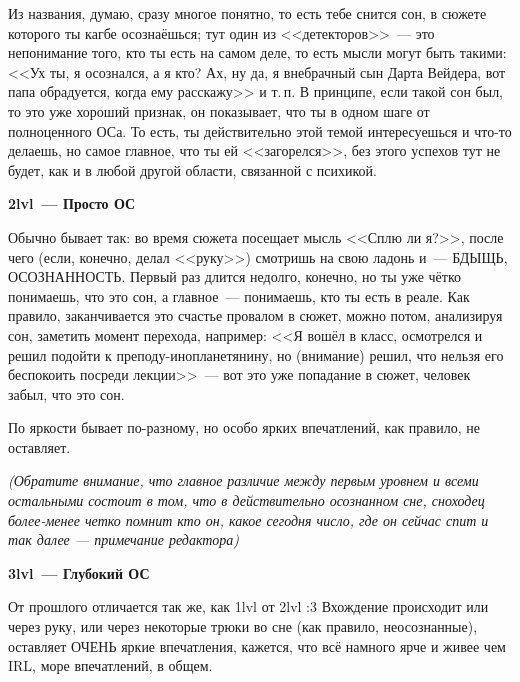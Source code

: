 \documentclass[a4paper,14pt,oneside]{memoir}
\begin{document}
\medskip

Из названия, думаю, сразу многое понятно, то есть тебе снится сон, в сюжете которого ты кагбе осознаёшься; тут один из <<детекторов>>~--- это непонимание того, кто ты есть на самом деле, то есть мысли могут быть такими: <<Ух ты, я осознался, а я кто? Ах, ну да, я внебрачный сын Дарта Вейдера, вот папа обрадуется, когда ему расскажу>> и т.\,п.
В принципе, если такой сон был, то это уже хороший признак, он показывает, что ты в одном шаге от полноценного ОСа. То есть, ты действительно этой темой интересуешься и что-то делаешь, но самое главное, что ты ей <<загорелся>>, без этого успехов тут не будет, как и в любой другой области, связанной с психикой.

\bigskip

\begin{center}
\textbf{2lvl~--- Просто ОС}
\end{center}



Обычно бывает так: во время сюжета посещает мысль <<Сплю ли я?>>, после чего  (если, конечно, делал <<руку>>) смотришь на свою ладонь и~--- БДЫЩЬ, ОСОЗНАННОСТЬ. Первый раз длится недолго, конечно, но ты уже чётко понимаешь, что это сон, а главное~--- понимаешь, кто ты есть в реале. Как правило, заканчивается это счастье провалом в сюжет, можно потом, анализируя сон, заметить момент перехода, например: <<Я вошёл в класс, осмотрелся и решил подойти к преподу-инопланетянину, но (внимание) решил, что нельзя его беспокоить посреди лекции>>~--- вот это уже попадание в сюжет, человек забыл, что это сон.

По яркости бывает по-разному, но особо ярких впечатлений, как правило, не оставляет.

\textit{(Обратите внимание, что главное различие между первым уровнем и всеми остальными состоит в том, что в действительно осознанном сне, сноходец более-менее четко помнит кто он, какое сегодня число, где он сейчас спит и так далее --- примечание редактора)}



\begin{center}
\textbf{3lvl~--- Глубокий ОС}
\end{center}



От прошлого отличается так же, как 1lvl от 2lvl :3 Вхождение происходит или через руку, или через некоторые трюки во сне (как правило, неосознанные), оставляет ОЧЕНЬ яркие впечатления, кажется, что всё намного ярче и живее чем IRL, море впечатлений, в общем.
\end{document}
